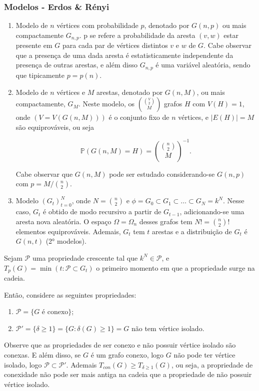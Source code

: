 \subsubsection{Modelos - Erdos \& Rényi}
\begin{enumerate}
    \item Modelo de $n$ vértices com probabilidade $p$, denotado por $G(n, p)$ ou mais compactamente $G_{n,p}$. p se refere a probabilidade da aresta $(v, w)$ estar presente em $G$ para cada par de vértices distintos $v$ e $w$ de $G$. Cabe observar que a presença de uma dada aresta é estatisticamente independente da presença de outras arestas, e além disso $G_{n,p}$ é uma variável aleatória, sendo que tipicamente $p = p(n)$.

    \item Modelo de $n$ vértices e $M$ arestas, denotado por $G(n, M)$, ou mais compactamente, $G_M$.  
    Neste modelo, os $\binom{\binom{V}{2}}{M}$ grafos $H$ com $V(H) = 1$, onde  $(V = V(G(n, M)))$ é o conjunto fixo de $n$ vértices, e $|E(H)| = M$ são equiprováveis, ou seja

    \begin{equation*}
        \mathbb{P}(G(n, M) = H) = \binom{\binom{n}{2}}{M}^{-1}.
    \end{equation*}{}

    Cabe observar que $G(n,M)$ pode ser estudado considerando-se $G(n,p)$ com $p = M / \binom{n}{2}$.

    \item Modelo $(G_t)_{t = 0}^N$, onde $N = \binom{n}{2}$ e $\phi = G_0 \subset G_1 \subset \dots \subset G_N = k^N$. Nesse caso, $G_t$ é obtido de modo recursivo a partir de $G_{t-1}$, adicionando-se uma aresta nova aleatória. O espaço $\Omega = \Omega_n$ desses grafos tem $N! = \binom{n}{2}!$ elementos equiprováveis. Ademais, $G_t$ tem $t$ arestas e a distribuição de $G_t$ é $G(n, t)$ (2° modelos).
\end{enumerate}



\begin{exemplo}
Sejam $\mathcal{P}$ uma propriedade crescente tal que $k^N \in \mathcal{P}$, e $T_p(G) = \min(t:\mathcal{P} \subset G_t )$ o primeiro momento em que a propriedade surge na cadeia.

Então, considere as seguintes propriedades:
\begin{enumerate}
    \item $\mathcal{P} = \{G \text{ é conexo}\}$;
    \item $\mathcal{P}' = \{\delta \geq 1\} = \{G: \delta(G) \geq 1\} = G$ não tem vértice isolado.
\end{enumerate}{}

Observe que as propriedades de ser conexo e não possuir vértice isolado são conexas. E além disso, se $G$ é um grafo conexo, logo $G$ não pode ter vértice isolado, logo $\mathcal{P} \subset \mathcal{P}'$. Ademais $T_{con}(G) \geq T_{\delta \geq 1}(G)$, ou seja, a propriedade de conexidade não pode ser mais antiga na cadeia que a propriedade de não possuir vértice isolado.
\end{exemplo}

